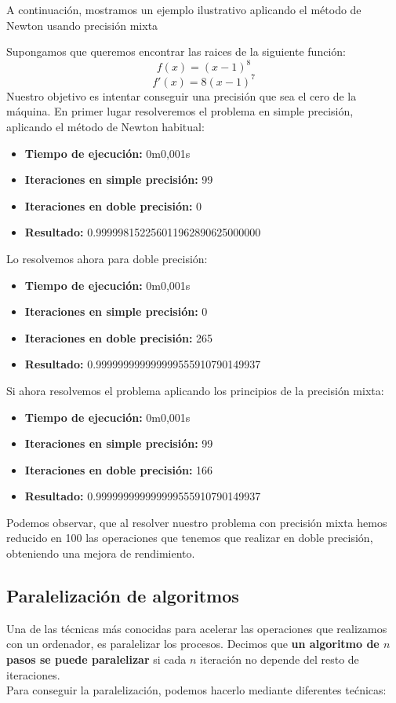 A continuación, mostramos un ejemplo ilustrativo aplicando el método de Newton usando precisión mixta
\begin{ejemplo}
  Supongamos que queremos encontrar las raices de la siguiente función:
  \[
  f(x) = (x-1)^8
  \]
  \[
  f'(x) = 8 (x-1)^7
  \]
  Nuestro objetivo es intentar conseguir una precisión que sea el cero de la máquina. En primer lugar resolveremos el problema en simple precisión, aplicando el método de Newton habitual:
  \begin{itemize}
  \item \textbf{Tiempo de ejecución: } 0m0,001s
  \item \textbf{Iteraciones en simple precisión: } 99
  \item \textbf{Iteraciones en doble precisión: } 0
  \item \textbf{Resultado: } 0.999998152256011962890625000000
  \end{itemize}

  Lo resolvemos ahora para doble precisión:
  \begin{itemize}
  \item \textbf{Tiempo de ejecución: } 0m0,001s
  \item \textbf{Iteraciones en simple precisión: } 0
  \item \textbf{Iteraciones en doble precisión: } 265
  \item \textbf{Resultado: } 0.999999999999999555910790149937
  \end{itemize}

  Si ahora resolvemos el problema aplicando los principios de la precisión mixta:
  \begin{itemize}
  \item \textbf{Tiempo de ejecución: } 0m0,001s
  \item \textbf{Iteraciones en simple precisión: } 99
  \item \textbf{Iteraciones en doble precisión: } 166
  \item \textbf{Resultado: } 0.999999999999999555910790149937
  \end{itemize}

  Podemos observar, que al resolver nuestro problema con precisión mixta hemos reducido en 100 las operaciones que tenemos que realizar en doble precisión, obteniendo una mejora de rendimiento.
\end{ejemplo}

\subsection{Paralelización de algoritmos}
Una de las técnicas más conocidas para acelerar las operaciones que realizamos con un ordenador, es paralelizar los procesos.  Decimos que \textbf{un algoritmo de $n$ pasos se puede paralelizar} si cada $n$ iteración no depende del resto de iteraciones. \\
Para conseguir la paralelización, podemos hacerlo mediante diferentes tećnicas:

